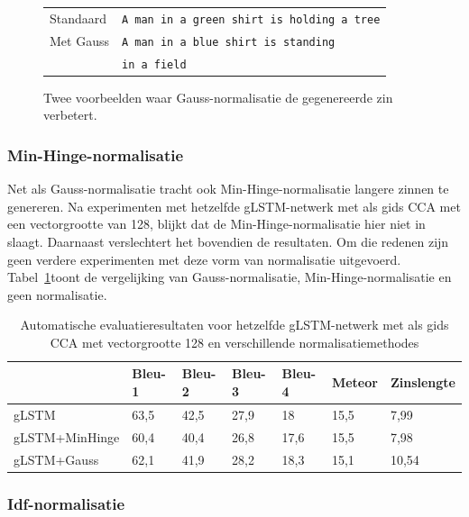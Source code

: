 \begin{figure}
\begin{minipage}[t]{.3\textwidth}
		\end{minipage}\hfill
		\begin{minipage}[t]{.7\textwidth}
			\vspace{0pt}
			\begin{tabular}{ll}
				Standaard & \texttt{A man in a green shirt is holding a tree} \\
				Met Gauss & \texttt{A man in a blue shirt is standing }\\
				~ & \texttt{in a field} \\
			\end{tabular}
		\end{minipage}
\caption{Twee voorbeelden waar Gauss-normalisatie de gegenereerde zin verbetert.}
\label{fig:gauss_improve}
\end{figure}
\subsubsection{Min-Hinge-normalisatie}
Net als Gauss-normalisatie tracht ook Min-Hinge-normalisatie langere zinnen te genereren.
Na experimenten met hetzelfde gLSTM-netwerk met als gids CCA met een vectorgrootte van 128, blijkt dat de Min-Hinge-normalisatie hier niet in slaagt. Daarnaast verslechtert het bovendien de resultaten. Om die redenen zijn geen verdere experimenten met deze vorm van normalisatie uitgevoerd. Tabel~\ref{table:minhinge}toont de vergelijking van Gauss-normalisatie, Min-Hinge-normalisatie en geen normalisatie.

\begin{table}
	\centering
	\begin{tabular}{lllllll}
		~                  & Bleu-1 & Bleu-2 & Bleu-3 & Bleu-4 & Meteor&Zinslengte \\ \hline
		gLSTM        & 63,5   & 42,5 			& 27,9   & 18   & 15,5&7,99  \\
		gLSTM+MinHinge & 60,4   &40,4    &26,8   & 17,6   & 15,5& 7,98 \\
		gLSTM+Gauss   & 62,1   & 41,9   & 28,2   & 18,3 & 15,1& 10,54 \\ \hline
		
	\end{tabular}
	
	\caption{Automatische evaluatieresultaten voor hetzelfde gLSTM-netwerk met als gids CCA met vectorgrootte 128 en verschillende normalisatiemethodes}
	\label{table:minhinge}
\end{table}

\subsubsection{Idf-normalisatie}

